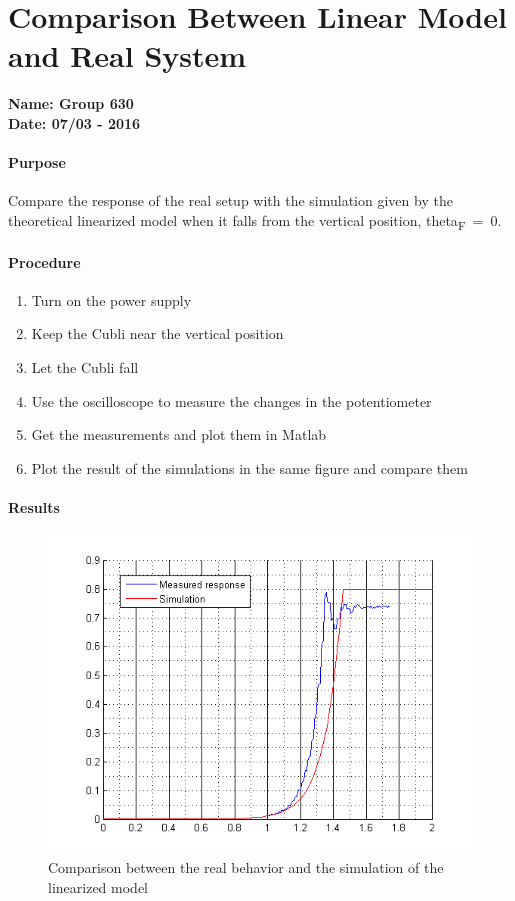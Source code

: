 \chapter{Comparison Between Linear Model and Real System}\label{comparisonLinModelReal} 
\textbf{Name: Group 630}\\
\textbf{Date: 07/03 - 2016}

\subsubsection{Purpose}
Compare the response of the real setup with the simulation given by the theoretical linearized model when it falls from the vertical position, \si{theta_F=0}.

\subsubsection{Procedure}
\begin{enumerate}
	\item Turn on the power supply
	\item Keep the Cubli near the vertical position
	\item Let the Cubli fall
	\item Use the oscilloscope to measure the changes in the potentiometer 
	\item Get the measurements and plot them in Matlab
	\item Plot the result of the simulations in the same figure and compare them

\end{enumerate}

\subsubsection{Results}
\begin{figure}[H] 
	\centering 
	\includegraphics[scale=0.9]{figures/comparisonRealModel}
	\caption{Comparison between the real behavior and the simulation of the linearized model}
	\label{comparisonRealModel}
\end{figure} 


